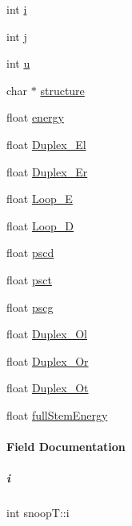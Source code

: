\begin{DoxyCompactItemize}
\item 
int \mbox{\hyperlink{group__data__structures_ab265b017019caad2f8121b46912f1a35}{i}}
\item 
int \mbox{\hyperlink{group__data__structures_a655f3b218fbf2d6d7a882b02e4fe1656}{j}}
\item 
int \mbox{\hyperlink{group__data__structures_a03224eb72cd9ba96435b13a0122f5572}{u}}
\item 
char $\ast$ \mbox{\hyperlink{group__data__structures_a91c6ad1b51c5c3fcab4b016e282ecdab}{structure}}
\item 
float \mbox{\hyperlink{group__data__structures_a327c9f135166d9fafa60e92566e977e4}{energy}}
\item 
float \mbox{\hyperlink{group__data__structures_ab567e3546bec5913121a76ea8900af09}{Duplex\+\_\+\+El}}
\item 
float \mbox{\hyperlink{group__data__structures_a04e6ed2a405c4ff915347bc10ee5312f}{Duplex\+\_\+\+Er}}
\item 
float \mbox{\hyperlink{group__data__structures_ae6be38a6ba9d0c959df2effd47fa0902}{Loop\+\_\+E}}
\item 
float \mbox{\hyperlink{group__data__structures_a5cf23d33ce2c78275a18ba0d6ffe0b75}{Loop\+\_\+D}}
\item 
float \mbox{\hyperlink{group__data__structures_afa0fcb2b43eee28eee4b54428cba6f1c}{pscd}}
\item 
float \mbox{\hyperlink{group__data__structures_a5c9b34b8a942d569cb527a8198929edc}{psct}}
\item 
float \mbox{\hyperlink{group__data__structures_a9fd035cfb440a7a8a6f003083448a1b3}{pscg}}
\item 
float \mbox{\hyperlink{group__data__structures_ab4a2b8e90f973c210ce8b3489c6fd229}{Duplex\+\_\+\+Ol}}
\item 
float \mbox{\hyperlink{group__data__structures_a6b962fdb4f06f118cf6ed141abe2ad8a}{Duplex\+\_\+\+Or}}
\item 
float \mbox{\hyperlink{group__data__structures_a16bfe1a79922cc4a33e18bbbb51cee61}{Duplex\+\_\+\+Ot}}
\item 
float \mbox{\hyperlink{group__data__structures_af1fa0deae33e51ccf529d9b5017e146d}{full\+Stem\+Energy}}
\end{DoxyCompactItemize}


\paragraph{Field Documentation}
\mbox{\label{group__data__structures_ab265b017019caad2f8121b46912f1a35}} 
\subparagraph{\texorpdfstring{i}{i}}
{\footnotesize\ttfamily int snoop\+T\+::i}

